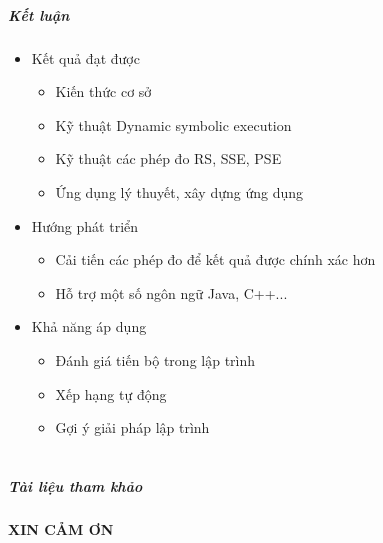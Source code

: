 \documentclass{beamer}
\begin{document}
\begin{frame}
  \frametitle{Kết luận}
	
  \begin{itemize}
  	\item Kết quả đạt được 
  	\begin{itemize}
  		\item Kiến thức cơ sở
  		\item Kỹ thuật Dynamic symbolic execution
  		\item Kỹ thuật các phép đo RS, SSE, PSE
  		\item Ứng dụng lý thuyết, xây dựng ứng dụng
  	\end{itemize} \pause
  	\item Hướng phát triển
  	\begin{itemize}
  		\item Cải tiến các phép đo để kết quả được chính xác hơn
  		\item Hỗ trợ một số ngôn ngữ Java, C++...
  	\end{itemize} \pause
  	\item Khả năng áp dụng
  	\begin{itemize}
  		\item Đánh giá tiến bộ trong lập trình
  		\item Xếp hạng tự động
  		\item Gợi ý giải pháp lập trình
  	\end{itemize}
  \end{itemize}
\end{frame}


\part{}

\begin{frame}
  \frametitle{Tài liệu tham khảo}
  
  {\footnotesize}
\end{frame}


\begin{frame}
  \begin{center}
    \begin{Huge}
      \textcolor{BlueGreen}{\textbf{XIN CẢM ƠN}}
    \end{Huge}
\end{center}

\end{frame}

\end{document}

